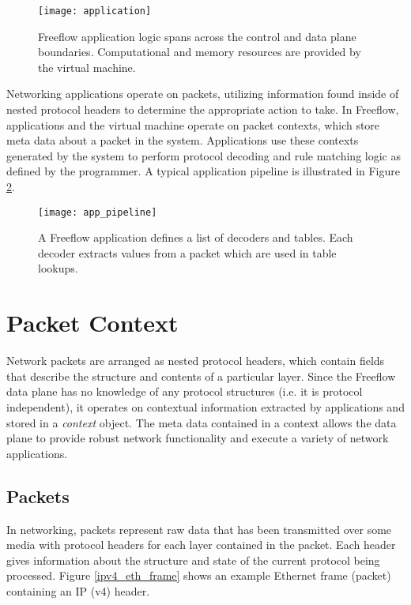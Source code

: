 \begin{figure}[h]
\centering
\texttt{[image: application]}
\caption{Freeflow application logic spans across the control and data plane
boundaries. Computational and memory resources are provided by the virtual
machine.}
\label{app}
\end{figure}

Networking applications operate on packets, utilizing information found inside
of nested protocol headers to determine the appropriate action to take. In
Freeflow, applications and the virtual machine operate on packet contexts,
which store meta data about a packet in the system. Applications use these
contexts generated by the system to perform protocol decoding and rule
matching logic as defined by the programmer. A typical application pipeline is
illustrated in Figure \ref{app_pipeline}.

\begin{figure}[h]
\centering
\texttt{[image: app\_pipeline]}
\caption{A Freeflow application defines a list of decoders and tables.
Each decoder extracts values from a packet which are used in table lookups.}
\label{app_pipeline}
\end{figure}

\section{Packet Context}
\label{vm:packet-context}
Network packets are arranged as nested protocol headers, which contain fields
that describe the structure and contents of a particular layer. Since the
Freeflow data plane has no knowledge of any protocol structures (i.e. it is
protocol independent), it operates on contextual information extracted by
applications and stored in a \emph{context} object. The meta data contained
in a context allows the data plane to provide robust network functionality
and execute a variety of network applications.

\subsection{Packets}
In networking, packets represent raw data that has been transmitted over some
media with protocol headers for each layer contained in the packet. Each header
gives information about the structure and state of the current protocol being
processed. Figure \ref{ipv4_eth_frame} shows an example Ethernet frame
(packet) containing an IP (v4) header.

